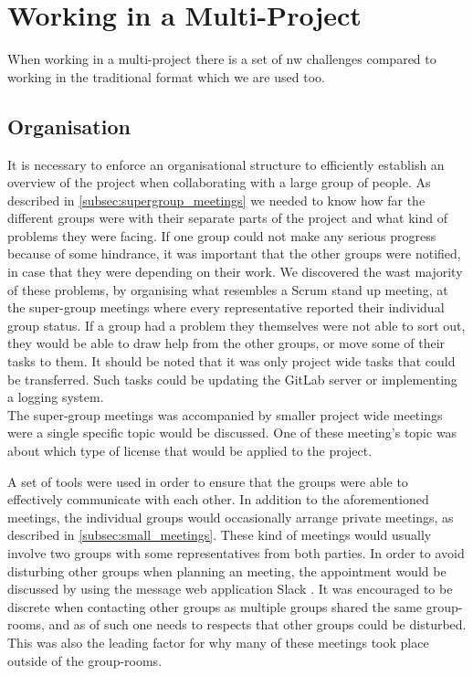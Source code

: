 \section{Working in a Multi-Project}
When working in a multi-project there is a set of nw challenges compared to working in the traditional format which we are used too.

\subsection{Organisation}
It is necessary to enforce an organisational structure to efficiently establish an overview of the project when collaborating with a large group of people. As described in \cref{subsec:supergroup_meetings} we needed to know how far the different groups were with their separate parts of the project and what kind of problems they were facing. If one group could not make any serious progress because of some hindrance, it was important that the other groups were notified, in case that they were depending on their work. We discovered the wast majority of these problems, by organising what resembles a Scrum stand up meeting, at the super-group meetings where every representative reported their individual group status. If a group had a problem they themselves were not able to sort out, they would be able to draw help from the other groups, or move some of their tasks to them. It should be noted that it was only project wide tasks that could be transferred. Such tasks could be updating the GitLab server or implementing a logging system. \\
The super-group meetings was accompanied by smaller project wide meetings were a single specific topic would be discussed. One of these meeting's topic was about which type of license that would be applied to the project.

A set of tools were used in order to ensure that the groups were able to effectively communicate with each other. In addition to the aforementioned meetings, the individual groups would occasionally arrange private meetings, as described in \cref{subsec:small_meetings}. These kind of meetings would usually involve two groups with some representatives from both parties. In order to avoid disturbing other groups when planning an meeting, the appointment would be discussed by using the message web application Slack \cite{slack}. It was encouraged to be discrete when contacting other groups as multiple groups shared the same group-rooms, and as of such one needs to respects that other groups could be disturbed. This was also the leading factor for why many of these meetings took place outside of the group-rooms.


